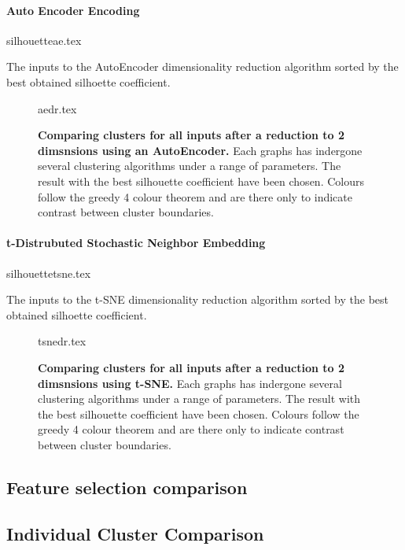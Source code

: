 \paragraph*{Auto Encoder Encoding}

\begin{table}[H]
    \centering
        {silhouetteae.tex}
        \caption{The inputs to the AutoEncoder dimensionality reduction algorithm sorted by the best obtained silhoette coefficient.  }
        \label{tab:aesil}
\end{table}





\begin{landscape}
\begin{figure}[H]
    {aedr.tex}
    \caption{\textbf{Comparing clusters for all inputs after a reduction to 2 dimsnsions using an AutoEncoder.}
    Each graphs has indergone several clustering algorithms under a range of parameters. The result with the best silhouette coefficient have been chosen. Colours follow the greedy 4 colour theorem and are there only to indicate contrast between cluster boundaries.}
    \label{fig:aevis}
\end{figure}
\end{landscape}










\paragraph*{t-Distrubuted Stochastic Neighbor Embedding}

\begin{table}[H]
    \centering
        {silhouettetsne.tex}
        \caption{The inputs to the t-SNE dimensionality reduction algorithm sorted by the best obtained silhoette coefficient.  }
        \label{tab:tsnesil}
\end{table}




\begin{landscape}
\begin{figure}[H]
    {tsnedr.tex}
    \caption{\textbf{Comparing clusters for all inputs after a reduction to 2 dimsnsions using t-SNE.}
    Each graphs has indergone several clustering algorithms under a range of parameters. The result with the best silhouette coefficient have been chosen. Colours follow the greedy 4 colour theorem and are there only to indicate contrast between cluster boundaries.}
    \label{fig:tsnevis}
\end{figure}
\end{landscape}



\subsection{Feature selection comparison}\label{sec:fsclust}



\subsection{Individual Cluster Comparison}\label{sec:selectcomp}